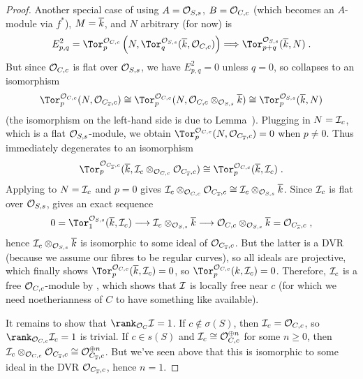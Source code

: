 \documentclass[a4paper,parskip=half,numbers=enddot, DIV=12]{scrreprt}
\renewcommand{\geq}{\geqslant}
\begin{document}
\begin{proof}
	Another special case of  using $A=\mathcal{O}_{S,s}$, $B=\mathcal{O}_{C,c}$ (which becomes an $A$-module via $f^*$), $M=\overline{k}$, and $N$ arbitrary (for now) is
	\begin{align}\lbl{eq:TorSS2}
		E_{p,q}^2=\Tor_p^{\Oo_{C,c}}\left(N,\Tor_q^{\Oo_{S,s}}(\ov{k},\Oo_{C,c})\right)\converge\Tor_{p+q}^{\Oo_{S,s}}(\ov{k},N)\;.
	\end{align}
	But since $\mathcal{O}_{C,c}$ is flat over $\mathcal{O}_{S,s}$, we have $E_{p,q}^2=0$ unless $q=0$, so  collapses to an isomorphism
	\begin{align}\lbl{eq:TorSS3}
	 	\Tor_p^{\Oo_{C,c}}(N,\Oo_{C_{\ov{s}},c})\cong\Tor_p^{\Oo_{C,c}}(N,\Oo_{C,c}\otimes_{\Oo_{S,s}}\ov{k})\cong\Tor_p^{\Oo_{S,s}}(\ov{k},N)
	\end{align}
	(the isomorphism on the left-hand side is due to Lemma~). Plugging in $N=\mathcal{I}_c$, which is a flat $\mathcal{O}_{S,s}$-module, we obtain $\Tor_p^{\Oo_{C,c}}(N,\Oo_{C_{\ov{s}},c})=0$ when $p\neq 0$. Thus  immediately degenerates to an isomorphism
	\begin{align*}
		\Tor_p^{\Oo_{C_{\ov{s}},c}}(\ov{k},\Ii_c\otimes_{\Oo_{C,c}}\Oo_{C_{\ov{s}},c})\cong\Tor_p^{\Oo_{C,c}}(\ov{k},\Ii_c)\;.
	\end{align*}
	Applying  to $N=\mathcal{I}_c$ and $p=0$ gives $\mathcal{I}_c\otimes_{\mathcal{O}_{C,c}}\mathcal{O}_{C_{\overline{s}},c}\cong \mathcal{I}_c\otimes_{\mathcal{O}_{S,s}}\overline{k}$. Since $\mathcal{I}_c$ is flat over $\mathcal{O}_{S,s}$,  gives an exact sequence
	\begin{align*}
		0=\Tor_1^{\Oo_{S,s}}(\ov{k},\Ii_c)\morphism \Ii_c\otimes_{\Oo_{S,s}}\ov{k}\morphism\Oo_{C,c}\otimes_{\Oo_{S,s}}\ov{k}=\Oo_{C_{\ov{s}},c}\;,
	\end{align*}
	hence $\mathcal{I}_c\otimes_{\mathcal{O}_{S,s}}\overline{k}$ is isomorphic to some ideal of $\mathcal{O}_{C_{\overline{s}},c}$. But the latter is a DVR (because we assume our fibres to be regular curves), so all ideals are projective, which finally shows $\Tor_p^{\Oo_{C,c}}(\ov{k},\Ii_c)=0$, so $\Tor_p^{\Oo_{C,c}}(k,\Ii_c)=0$. Therefore, $\mathcal{I}_c$ is a free $\mathcal{O}_{C,c}$-module by \cite[Proposition~1.3.1]{homalg}, which shows that $\mathcal{I}$ is locally free near $c$ (for which we need noetherianness of $C$ to have something like \cite[Corollary~1.5.1]{alg2} available).
	
	It remains to show that $\rank_{\Oo_C} \Ii=1$. If $c\notin \sigma(S)$, then $\mathcal{I}_c=\mathcal{O}_{C,c}$, so $\rank_{\Oo_{C,c}}\Ii_c=1$ is trivial. If $c\in s(S)$ and $\mathcal{I}_c\cong \mathcal{O}_{C,c}^{\oplus n}$ for some $n\geq 0$, then $\mathcal{I}_c\otimes_{\mathcal{O}_{C,c}}\mathcal{O}_{C_{\overline{s}},c}\cong \mathcal{O}_{C_{\overline{s}},c}^{\oplus n}$. But we've seen above that this is isomorphic to some ideal in the DVR $\mathcal{O}_{C_{\overline{s}},c}$, hence $n=1$.
\end{proof}
\end{document}
